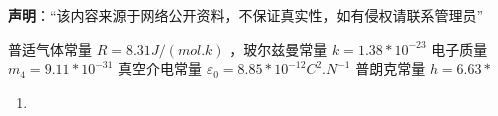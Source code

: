 
\textbf{声明}：“该内容来源于网络公开资料，不保证真实性，如有侵权请联系管理员”


普适气体常量  $R=8.31 J/(mol.k)$ ，玻尔兹曼常量 $k=1.38*10^{-23}$   电子质量  $m_4=9.11*10^{-31}$ 真空介电常量 $\varepsilon_0=8.85*10^{-12}C^2.N^{-1}$  普朗克常量 $h=6.63*$
\begin{enumerate}
\item 
\end{enumerate}
